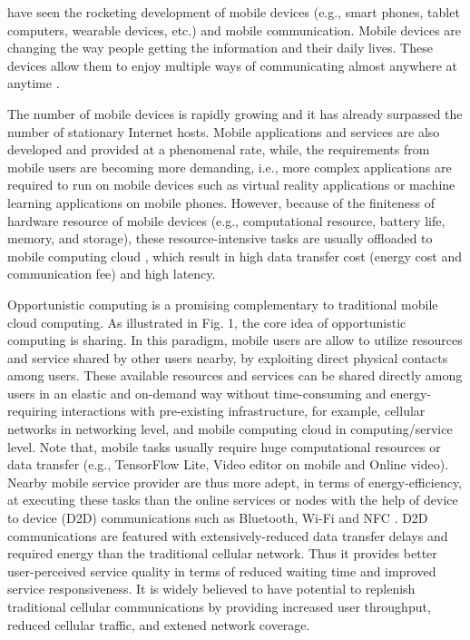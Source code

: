 \documentclass[journal]{IEEEtran}
\begin{document}
 have seen the rocketing development of mobile devices (e.g., smart phones, tablet computers, wearable devices, etc.) and mobile communication.
Mobile devices are changing the way people getting the information and their daily lives.
These devices allow them to enjoy multiple ways of communicating almost anywhere at anytime \cite{satyanarayanan2010mobile}.

The number of mobile devices is rapidly growing and it has already surpassed the number of stationary Internet hosts.
Mobile applications and services are also developed and provided at a phenomenal rate, while, the requirements from mobile users are becoming more demanding, i.e., more complex applications are required to run on mobile devices such as virtual reality applications \cite{bastug2017toward} or machine learning applications \cite{abadi2016TensorFlow} on mobile phones. However, because of the finiteness of hardware resource of mobile devices (e.g., computational resource, battery life, memory, and storage), these resource-intensive tasks are usually offloaded to mobile computing cloud \cite{dinh2013survey}, which result in high data transfer cost (energy cost and communication fee) and high latency.

Opportunistic computing is a promising complementary to traditional mobile cloud computing. As illustrated in Fig. 1, the core idea of opportunistic computing is sharing. In this paradigm, mobile users are allow to utilize resources and service shared by other users nearby, by exploiting direct physical contacts among users.
These available resources and services can be shared directly among users in an elastic and on-demand way without time-consuming and energy-requiring interactions with pre-existing infrastructure, for example, cellular networks in networking level, and mobile computing cloud in computing/service level.
Note that, mobile tasks usually require huge computational resources or data transfer (e.g., TensorFlow Lite, Video editor on mobile and Online video). Nearby mobile service provider are thus more adept, in terms of energy-efficiency, at executing these tasks than the online services or nodes with the help of device to device (D2D) communications such as Bluetooth, Wi-Fi and NFC \cite{balani2007energy}. D2D communications are featured with extensively-reduced data transfer delays and required energy than the traditional cellular network. Thus it provides better user-perceived service quality in terms of reduced waiting time and improved service responsiveness. It is widely believed to have potential to replenish traditional cellular communications by providing increased user throughput, reduced cellular traffic, and extened network coverage.
\end{document}
